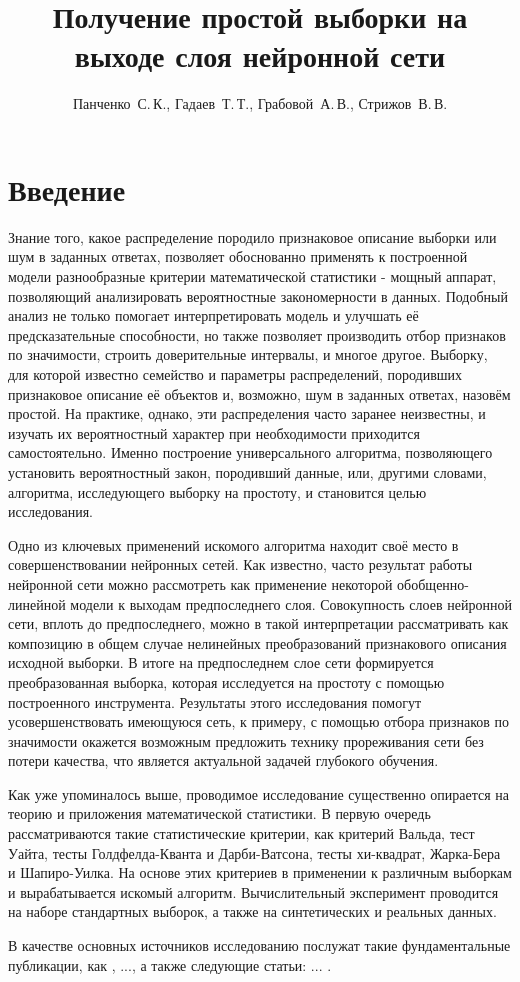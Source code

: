 \documentclass[12pt,twoside]{article}
\title
    [Получение простой выборки на выходе слоя нейронной сети] %
    {Получение простой выборки на выходе слоя нейронной сети}
\author
    [Панченко~С.\,К.] %
    {Панченко~С.\,К., Гадаев~Т.\,Т., Грабовой~А.\,В., Стрижов~В.\,В.} %
    [Панченко~С.\,К.$^1$, Гадаев~Т.\,Т.$^1$, Грабовой~А.\,В.$^1$, Стрижов~В.\,В.] %
\begin{document}
\maketitle
\section{Введение}
Знание того, какое распределение породило признаковое описание выборки или шум в заданных ответах, позволяет обоснованно применять к построенной модели разнообразные критерии математической статистики - мощный аппарат, позволяющий анализировать вероятностные закономерности в данных. Подобный анализ не только помогает интерпретировать модель и улучшать её предсказательные способности, но также позволяет производить отбор признаков по значимости, строить доверительные интервалы, и многое другое. Выборку, для которой известно семейство и параметры распределений, породивших признаковое описание её объектов и, возможно, шум в заданных ответах, назовём простой. На практике, однако, эти распределения часто заранее неизвестны, и изучать их вероятностный характер при необходимости приходится самостоятельно. Именно построение универсального алгоритма, позволяющего установить вероятностный закон, породивший данные, или, другими словами, алгоритма, исследующего выборку на простоту, и становится целью исследования. \par
Одно из ключевых применений искомого алгоритма находит своё место в совершенствовании нейронных сетей. Как известно, часто результат работы нейронной сети можно рассмотреть как применение некоторой обобщенно-линейной модели к выходам предпоследнего слоя. Совокупность слоев нейронной сети, вплоть до предпоследнего, можно в такой интерпретации рассматривать как композицию в общем случае нелинейных преобразований признакового описания исходной выборки. В итоге на предпоследнем слое сети формируется преобразованная выборка, которая исследуется на простоту с помощью построенного инструмента. Результаты этого исследования помогут усовершенствовать имеющуюся сеть, к примеру, с помощью отбора признаков по значимости окажется возможным предложить технику прореживания сети без потери качества, что является актуальной задачей глубокого обучения. \par
Как уже упоминалось выше, проводимое исследование существенно опирается на теорию и приложения математической статистики. В первую очередь рассматриваются такие статистические критерии, как критерий Вальда, тест Уайта, тесты Голдфелда-Кванта и Дарби-Ватсона, тесты хи-квадрат, Жарка-Бера и Шапиро-Уилка. На основе этих критериев в применении к различным выборкам и вырабатывается искомый алгоритм. Вычислительный эксперимент проводится на наборе стандартных выборок, а также на синтетических и реальных данных. \par
В качестве основных источников исследованию послужат такие фундаментальные публикации, как \cite{books/lib/Bishop07}, ..., а также следующие статьи: ... .
\end{document}

